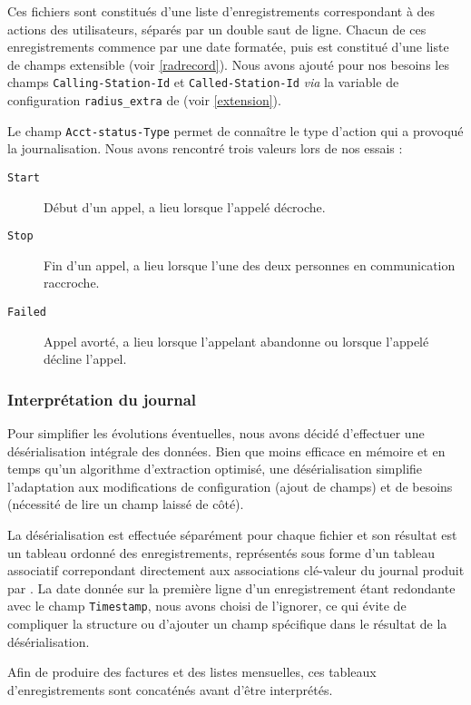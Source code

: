 Ces fichiers sont constitués d’une liste d’enregistrements correspondant à des actions des utilisateurs, séparés par un double saut de ligne. Chacun de ces enregistrements commence par une date formatée, puis est constitué d’une liste de champs extensible (voir \cref{radrecord}). Nous avons ajouté pour nos besoins les champs \texttt{Calling-Station-Id} et \texttt{Called-Station-Id} \textit{via} la variable de configuration \texttt{radius\_extra} de {\kam} (voir \cref{extension}).

Le champ \texttt{Acct-status-Type} permet de connaître le type d’action qui a provoqué la journalisation. Nous avons rencontré trois valeurs lors de nos essais :
\begin{description}
	\item[\texttt{Start}] Début d’un appel, a lieu lorsque l’appelé décroche.
	\item[\texttt{Stop}] Fin d’un appel, a lieu lorsque l’une des deux personnes en communication raccroche.
	\item[\texttt{Failed}] Appel avorté, a lieu lorsque l’appelant abandonne ou lorsque l’appelé décline l’appel.
\end{description}

\subsubsection{Interprétation du journal}

Pour simplifier les évolutions éventuelles, nous avons décidé d’effectuer une désérialisation intégrale des données. Bien que moins efficace en mémoire et en temps qu’un algorithme d’extraction optimisé, une désérialisation simplifie l’adaptation aux modifications de configuration (ajout de champs) et de besoins (nécessité de lire un champ laissé de côté).

La désérialisation est effectuée séparément pour chaque fichier et son résultat est un tableau ordonné des enregistrements, représentés sous forme d’un tableau associatif correpondant directement aux associations clé-valeur du journal produit par {\frad}. La date donnée sur la première ligne d’un enregistrement étant redondante avec le champ \texttt{Timestamp}, nous avons choisi de l’ignorer, ce qui évite de compliquer la structure ou d’ajouter un champ spécifique dans le résultat de la désérialisation.

Afin de produire des factures et des listes mensuelles, ces tableaux d’enregistrements sont concaténés avant d’être interprétés.

